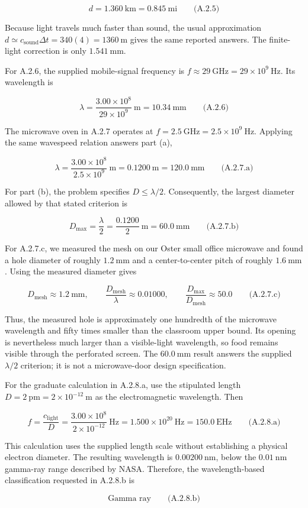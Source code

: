 \[\boxed{d=1.360\ \mathrm{km}=0.845\ \mathrm{mi}}\qquad\text{(A.2.5)}\]

Because light travels much faster than sound, the usual approximation \(d\simeq c_{\mathrm{sound}}\Delta t=340(4)=1360\ \mathrm{m}\) gives the same reported answers. The finite-light correction is only \(1.541\ \mathrm{mm}\).

For A.2.6, the supplied mobile-signal frequency is \(f\approx29\ \mathrm{GHz}=29\times10^9\ \mathrm{Hz}\). Its wavelength is

\[\boxed{\lambda=\frac{3.00\times10^8}{29\times10^9}\ \mathrm{m}=10.34\ \mathrm{mm}}\qquad\text{(A.2.6)}\]

The microwave oven in A.2.7 operates at \(f=2.5\ \mathrm{GHz}=2.5\times10^9\ \mathrm{Hz}\). Applying the same wavespeed relation answers part (a),

\[\boxed{\lambda=\frac{3.00\times10^8}{2.5\times10^9}\ \mathrm{m}=0.1200\ \mathrm{m}=120.0\ \mathrm{mm}}\qquad\text{(A.2.7.a)}\]

For part (b), the problem specifies \(D\leq\lambda/2\). Consequently, the largest diameter allowed by that stated criterion is

\[\boxed{D_{\max}=\frac{\lambda}{2}=\frac{0.1200}{2}\ \mathrm{m}=60.0\ \mathrm{mm}}\qquad\text{(A.2.7.b)}\]

For A.2.7.c, we measured the mesh on our Oster small office microwave and found a hole diameter of roughly \(1.2\ \mathrm{mm}\) and a center-to-center pitch of roughly \(1.6\ \mathrm{mm}\). Using the measured diameter gives

\[\boxed{D_{\mathrm{mesh}}\approx1.2\ \mathrm{mm},\qquad
\frac{D_{\mathrm{mesh}}}{\lambda}\approx0.01000,\qquad
\frac{D_{\max}}{D_{\mathrm{mesh}}}\approx50.0}\qquad\text{(A.2.7.c)}\]

Thus, the measured hole is approximately one hundredth of the microwave wavelength and fifty times smaller than the classroom upper bound. Its opening is nevertheless much larger than a visible-light wavelength, so food remains visible through the perforated screen. The \(60.0\ \mathrm{mm}\) result answers the supplied \(\lambda/2\) criterion; it is not a microwave-door design specification.

For the graduate calculation in A.2.8.a, use the stipulated length \(D=2\ \mathrm{pm}=2\times10^{-12}\ \mathrm{m}\) as the electromagnetic wavelength. Then

\[\boxed{f=\frac{c_{\mathrm{light}}}{D}=\frac{3.00\times10^8}{2\times10^{-12}}\ \mathrm{Hz}=1.500\times10^{20}\ \mathrm{Hz}=150.0\ \mathrm{EHz}}\qquad\text{(A.2.8.a)}\]

This calculation uses the supplied length scale without establishing a physical electron diameter. The resulting wavelength is \(0.00200\ \mathrm{nm}\), below the \(0.01\ \mathrm{nm}\) gamma-ray range described by NASA. Therefore, the wavelength-based classification requested in A.2.8.b is

\[\boxed{\text{Gamma ray}}\qquad\text{(A.2.8.b)}\]

\clearpage
{}


